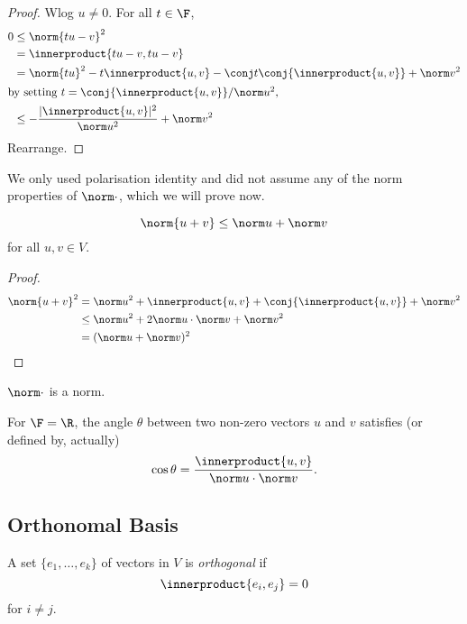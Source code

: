 \documentclass[a4paper]{article}
\newcommand*{\ip}{\innerproduct}
\theoremstyle{definition}
\begin{document}
\begin{proof}
  Wlog \(u \neq 0\). For all \(t \in \F\),
  \begin{align*}
    0 &\leq \norm{tu - v}^2 \\
      &= \ip{tu - v, tu - v} \\
      &= \norm{tu}^2 - t \ip{u, v} - \conj t \conj{\ip{u, v}} + \norm v^2 \\
    \intertext{by setting \(t = \conj{\ip{u, v}}/\norm u^2\),}
      &\leq - \frac{|\ip{u, v}|^2}{\norm u^2} + \norm v^2
  \end{align*}
  Rearrange.
\end{proof}

\begin{note}
  We only used polarisation identity and did not assume any of the norm properties of \(\norm \cdot\), which we will prove now.
\end{note}

\begin{corollary}
  \[
    \norm{u + v} \leq \norm u + \norm v
  \]
  for all \(u, v \in V\).
\end{corollary}

\begin{proof}
  \begin{align*}
    \norm{u + v}^2 &= \norm u^2 + \ip{u, v} + \conj{\ip{u, v}} + \norm v^2 \\
                   &\leq \norm u^2 + 2 \norm u \cdot \norm v + \norm v^2 \\
                   &= (\norm u + \norm v)^2
  \end{align*}
\end{proof}

\begin{corollary}
  \(\norm \cdot\) is a norm.
\end{corollary}

\begin{remark}
  For \(\F = \R\), the angle \(\theta\) between two non-zero vectors \(u\) and \(v\) satisfies (or defined by, actually)
  \[
    \cos \theta = \frac{\ip{u, v}}{\norm u \cdot \norm v}.
  \]
\end{remark}

\subsection{Orthonomal Basis}

\begin{definition}[Orthogonality]
  A set \(\{e_1, \dots, e_k\}\) of vectors in \(V\) is \emph{orthogonal} if
  \[
    \ip{e_i, e_j} = 0
  \]
  for \(i \neq j\).
\end{definition}
\end{document}
